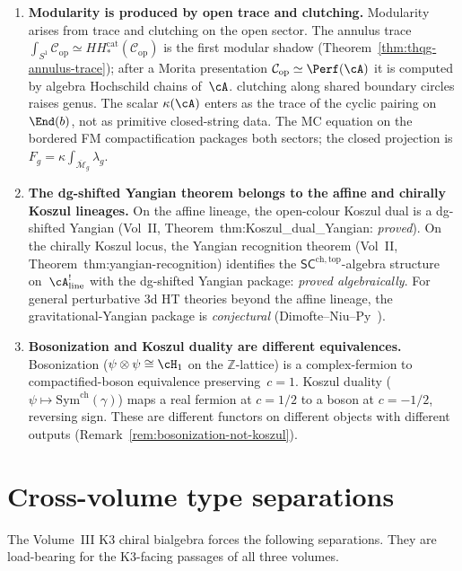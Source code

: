 \begin{enumerate}
\item \textbf{Modularity is produced by open trace and clutching.}
 Modularity arises from trace and clutching on the
 open sector. The annulus trace
 $\int_{S^1} \mathcal{C}_{\mathrm{op}} \simeq
 HH_*^{\mathrm{cat}}(\mathcal{C}_{\mathrm{op}})$ is the first
 modular shadow
 (Theorem~\ref{thm:thqg-annulus-trace});
 after a Morita presentation
 $\mathcal C_{\mathrm{op}}\simeq\Perf(\cA)$ it is computed by algebra
 Hochschild chains of~$\cA$.
 clutching along shared boundary circles raises
 genus. The scalar $\kappa(\cA)$ enters as the trace
 of the cyclic pairing on~$\End(b)$, not as
 primitive closed-string data. The MC equation on
 the bordered FM compactification packages both
 sectors; the closed projection is
 $F_g = \kappa \int_{\overline{\mathcal{M}}_g}
 \lambda_g$.

\item \textbf{The dg-shifted Yangian theorem belongs to the affine
 and chirally Koszul lineages.}
 On the affine lineage, the open-colour Koszul dual
 is a dg-shifted Yangian
 (Vol~II, Theorem~\textup{thm:Koszul\_dual\_Yangian}:
 \emph{proved}).
 On the chirally Koszul locus, the Yangian
 recognition theorem
 (Vol~II, Theorem~\textup{thm:yangian-recognition}) identifies
 the $\mathsf{SC}^{\mathrm{ch,top}}$-algebra
 structure on~$\cA^!_{\mathrm{line}}$ with the
 dg-shifted Yangian package: \emph{proved
 algebraically}. For general perturbative 3d HT
 theories beyond the affine lineage, the
 gravitational-Yangian package is
 \emph{conjectural}
 (Dimofte--Niu--Py~\cite{DNP25}).

\item \textbf{Bosonization and Koszul duality are different
 equivalences.}
 Bosonization ($\psi \otimes \psi \cong \cH_1$
 on the $\mathbb{Z}$-lattice) is a complex-fermion to
 compactified-boson equivalence preserving~$c = 1$.
 Koszul duality ($\psi \mapsto
 \mathrm{Sym}^{\mathrm{ch}}(\gamma)$)
 maps a real fermion at $c = 1/2$ to a boson at
 $c = -1/2$, reversing sign. These are different
 functors on different objects with different outputs
 (Remark~\ref{rem:bosonization-not-koszul}).

\end{enumerate}

\section{Cross-volume type separations}
\label{sec:concordance-supplement}

The Volume~III K3 chiral bialgebra forces the following separations.
They are load-bearing for the K3-facing passages of all three volumes.

